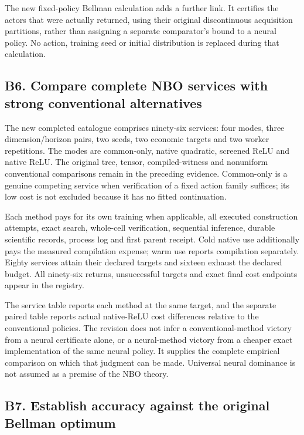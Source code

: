 \documentclass[ecta,nameyear,draft]{econsocart}
\begin{document}
The new fixed-policy Bellman calculation adds a further link. It
certifies the actors that were actually returned, using their original
discontinuous acquisition partitions, rather than assigning a separate
comparator's bound to a neural policy. No action, training seed or
initial distribution is replaced during that calculation.

\hypertarget{b6.-compare-complete-nbo-services-with-strong-conventional-alternatives}{%
\subsection{B6. Compare complete NBO services with strong conventional
alternatives}\label{b6.-compare-complete-nbo-services-with-strong-conventional-alternatives}}

The new completed catalogue comprises ninety-six services: four modes,
three dimension/horizon pairs, two seeds, two economic targets and two
worker repetitions. The modes are common-only, native quadratic,
screened ReLU and native ReLU. The original tree, tensor,
compiled-witness and nonuniform conventional comparisons remain in the
preceding evidence. Common-only is a genuine competing service when
verification of a fixed action family suffices; its low cost is not
excluded because it has no fitted continuation.

Each method pays for its own training when applicable, all executed
construction attempts, exact search, whole-cell verification, sequential
inference, durable scientific records, process log and first parent
receipt. Cold native use additionally pays the measured compilation
expense; warm use reports compilation separately. Eighty services attain
their declared targets and sixteen exhaust the declared budget. All
ninety-six returns, unsuccessful targets and exact final cost endpoints
appear in the registry.

The service table reports each method at the same target, and the
separate paired table reports actual native-ReLU cost differences
relative to the conventional policies. The revision does not infer a
conventional-method victory from a neural certificate alone, or a
neural-method victory from a cheaper exact implementation of the same
neural policy. It supplies the complete empirical comparison on which
that judgment can be made. Universal neural dominance is not assumed as
a premise of the NBO theory.

\hypertarget{b7.-establish-accuracy-against-the-original-bellman-optimum}{%
\subsection{B7. Establish accuracy against the original Bellman
optimum}\label{b7.-establish-accuracy-against-the-original-bellman-optimum}}
\end{document}
